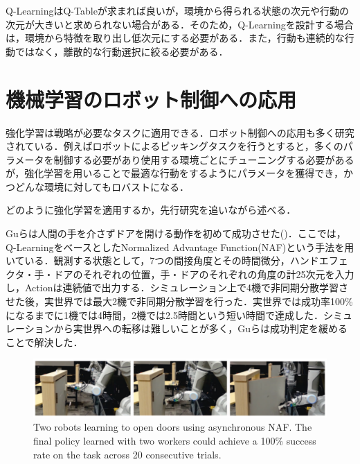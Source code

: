 Q-LearningはQ-Tableが求まれば良いが，環境から得られる状態の次元や行動の次元が大きいと求められない場合がある．そのため，Q-Learningを設計する場合は，環境から特徴を取り出し低次元にする必要がある．また，行動も連続的な行動ではなく，離散的な行動選択に絞る必要がある．


\section{機械学習のロボット制御への応用}
強化学習は戦略が必要なタスクに適用できる．ロボット制御への応用も多く研究されている．例えばロボットによるピッキングタスクを行うとすると，多くのパラメータを制御する必要があり使用する環境ごとにチューニングする必要があるが，強化学習を用いることで最適な行動をするようにパラメータを獲得でき，かつどんな環境に対してもロバストになる．

どのように強化学習を適用するか，先行研究を追いながら述べる．

Guらは人間の手を介さずドアを開ける動作を初めて成功させた\cite{Gu2017}()．ここでは，Q-LearningをベースとしたNormalized Advantage Function(NAF)という手法\cite{NAF}を用いている．観測する状態として，7つの間接角度とその時間微分，ハンドエフェクタ・手・ドアのそれぞれの位置，手・ドアのそれぞれの角度の計25次元を入力し，Actionは連続値で出力する．シミュレーション上で4機で非同期分散学習させた後，実世界では最大2機で非同期分散学習を行った．実世界では成功率100\%になるまでに1機では4時間，2機では2.5時間という短い時間で達成した．シミュレーションから実世界への転移は難しいことが多く，Guらは成功判定を緩めることで解決した．
\begin{figure}
    \centering
    \includegraphics[width=\linewidth]{figure/chapter2/Gu}
    \caption[Two robots learning to open doors using asynchronous NAF. The final policy learned with two workers could achieve a 100\% success rate on the task across 20 consecutive trials.]{Two robots learning to open doors using asynchronous NAF. The final policy learned with two workers could achieve a 100\% success rate on the task across 20 consecutive trials\cite{Gu2017}.}
    \label{fig:Gu}
\end{figure}


